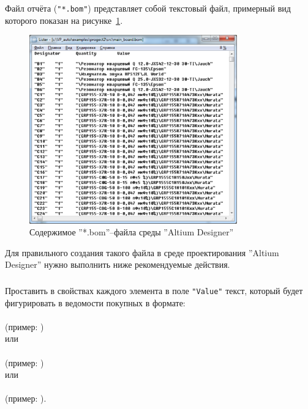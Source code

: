  Файл отчёта (\verb|"*.bom"|) представляет собой текстовый файл, примерный вид которого показан на рисунке~\ref{p:pic_ad_low_bom_file}.

\begin{figure}[H]\center
  \includegraphics[width=0.8\textwidth]{VP_auto/pictures/ad/pic_ad_low_bom_file}
  \caption{Содержимое ''*.bom''--файла среды ''Altium Designer''} \label{p:pic_ad_low_bom_file}
\end{figure}

Для правильного создания такого файла в среде проектирования ''Altium Designer'' нужно выполнить ниже рекомендуемые действия.

\subsubsection{}Проставить в свойствах каждого элемента в поле \verb|"Value"| текст, который будет фигурировать в ведомости покупных в формате: \\
 \\ \hspace*{20mm} (пример: )\\
или \\
 \\ \hspace*{20mm} (пример: )\\
или \\
 \\ \hspace*{20mm} (пример: ).

